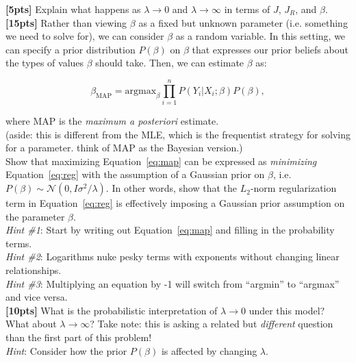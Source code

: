 \documentclass[paper=a4, fontsize=11pt]{scrartcl} %
\numberwithin{figure}{section} %
\numberwithin{table}{section} %
\begin{document}
\textbf{[5pts]} Explain what happens as $\lambda \rightarrow 0$ and $\lambda \rightarrow \infty$ in terms of $J$, $J_R$, and $\beta$. \\

\textbf{[15pts]} Rather than viewing $\beta$ as a fixed but unknown parameter (i.e. something we need to solve for), we can consider $\beta$ as a random variable. In this setting, we can specify a prior distribution $P(\beta)$ on $\beta$ that expresses our prior beliefs about the types of values $\beta$ should take. Then, we can estimate $\beta$ as:

\begin{equation}
\beta_{\textrm{MAP}} = \textrm{argmax}_{\beta} \prod_{i = 1}^n P(Y_i | X_i; \beta) P(\beta),
\label{eq:map}
\end{equation}

where MAP is the \emph{maximum a posteriori} estimate. \\

(aside: this is different from the MLE, which is the frequentist strategy for solving for a parameter. think of MAP as the Bayesian version.) \\

Show that maximizing Equation~\ref{eq:map} can be expressed as \emph{minimizing} Equation~\ref{eq:reg} with the assumption of a Gaussian prior on $\beta$, i.e. $P(\beta) \sim \mathcal{N}(0, I\sigma^2 / \lambda)$. In other words, show that the $L_2$-norm regularization term in Equation~\ref{eq:reg} is effectively imposing a Gaussian prior assumption on the parameter $\beta$. \\

\emph{Hint \#1}: Start by writing out Equation~\ref{eq:map} and filling in the probability terms. \\

\emph{Hint \#2}: Logarithms nuke pesky terms with exponents without changing linear relationships. \\

\emph{Hint \#3}: Multiplying an equation by -1 will switch from ``argmin'' to ``argmax'' and vice versa. \\

\textbf{[10pts]} What is the probabilistic interpretation of $\lambda \rightarrow 0$ under this model? What about $\lambda \rightarrow \infty$? Take note: this is asking a related but \emph{different} question than the first part of this problem! \\

\emph{Hint}: Consider how the prior $P(\beta)$ is affected by changing $\lambda$.
\end{document}
